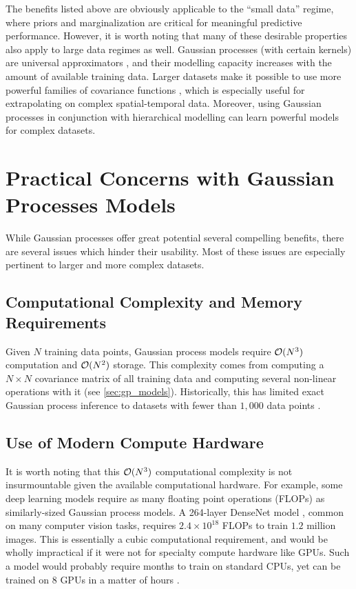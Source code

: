 The benefits listed above are obviously applicable to the ``small data'' regime, where priors and marginalization are critical for meaningful predictive performance.
However, it is worth noting that many of these desirable properties also apply to large data regimes as well.
Gaussian processes (with certain kernels) are universal approximators \cite{micchelli2006universal}, and their modelling capacity increases with the amount of available training data.
Larger datasets make it possible to use more powerful families of covariance functions \citep{wilson2013gaussian,wilson2016deep,benton2019function}, which is especially useful for extrapolating on complex spatial-temporal data.
Moreover, using Gaussian processes in conjunction with hierarchical modelling \cite{wilson2016deep,salimbeni2017doubly,jankowiak2020deep} can learn powerful models for complex datasets.


\section{Practical Concerns with Gaussian Processes Models}

While Gaussian processes offer great potential several compelling benefits, there are several issues which hinder their usability.
Most of these issues are especially pertinent to larger and more complex datasets.

\subsection{Computational Complexity and Memory Requirements}
Given $N$ training data points, Gaussian process models require $\bigo{N^3}$ computation and $\bigo{N^2}$ storage.
This complexity comes from computing a $N \times N$ covariance matrix of all training data and computing several non-linear operations with it (see \cref{sec:gp_models}).
Historically, this has limited exact Gaussian process inference to datasets with fewer than $1,\!000$ data points \cite{hensman2013gaussian,wilson2014thesis}.

\subsection{Use of Modern Compute Hardware}
It is worth noting that this $\bigo{N^3}$ computational complexity is not insurmountable given the available computational hardware.
For example, some deep learning models require as many floating point operations (FLOPs) as similarly-sized Gaussian process models.
A 264-layer DenseNet model \cite{huang2017densely}, common on many computer vision tasks, requires $2.4 \times 10^{18}$ FLOPs to train $1.2$ million images.
This is essentially a cubic computational requirement, and would be wholly impractical if it were not for specialty compute hardware like GPUs.
Such a model would probably require months to train on standard CPUs, yet can be trained on 8 GPUs in a matter of hours \cite{howard2018training}.

